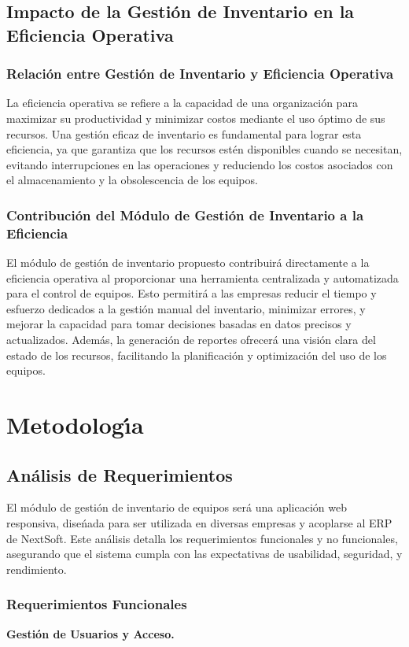 \documentclass[stu, 12pt, letterpaper, donotrepeattitle, floatsintext, natbib]{apa7}
\begin{document}
\subsection{Impacto de la Gesti\'on de Inventario en la Eficiencia Operativa}
\subsubsection{Relaci\'on entre Gesti\'on de Inventario y Eficiencia Operativa}
La eficiencia operativa se refiere a la capacidad de una organizaci\'on para maximizar su productividad y minimizar costos mediante el uso \'optimo de sus recursos. Una gesti\'on eficaz de inventario es fundamental para lograr esta
eficiencia, ya que garantiza que los recursos est\'en disponibles cuando se necesitan, evitando interrupciones en las operaciones y reduciendo los costos asociados con el almacenamiento y la obsolescencia de los equipos.
\subsubsection{Contribuci\'on del M\'odulo de Gesti\'on de Inventario a la Eficiencia}
El m\'odulo de gesti\'on de inventario propuesto contribuir\'a directamente a la eficiencia operativa al proporcionar una herramienta centralizada y automatizada para el control de equipos. Esto permitir\'a a las empresas reducir el
tiempo y esfuerzo dedicados a la gesti\'on manual del inventario, minimizar errores, y mejorar la capacidad para tomar decisiones basadas en datos precisos y actualizados. Adem\'as, la generaci\'on de reportes ofrecer\'a
una visi\'on clara del estado de los recursos, facilitando la planificaci\'on y optimizaci\'on del uso de los equipos.
\section{\large Metodolog\'{\i}a}
\subsection{An\'alisis de Requerimientos}
El m\'odulo de gesti\'on de inventario de equipos ser\'a una aplicaci\'on web responsiva, dise\'{n}ada para ser utilizada en diversas empresas y acoplarse al ERP de NextSoft. Este an\'alisis detalla los requerimientos funcionales y no funcionales,
asegurando que el sistema cumpla con las expectativas de usabilidad, seguridad, y rendimiento.
\subsubsection{Requerimientos Funcionales}
\textbf{Gesti\'on de Usuarios y Acceso.}
\end{document}
